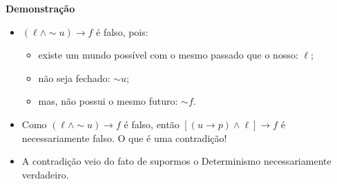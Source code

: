 \begin{frame}{\textbf{Demonstração}}
	
	\begin{itemize}
		\item<17->[$\bullet$] $(\ell \wedge \sim\! u ) \rightarrow f$ é falso, pois:
		 \begin{itemize}
				\item<18-|alert@18> existe um mundo possível com o mesmo passado que o nosso: $\ell$;
				\item<19-|alert@19> não seja fechado: $\sim\! u$;
				\item<20-|alert@20> mas, não possui o mesmo futuro: $\sim\! f$.
			\end{itemize}
		\item<21->[$\bullet$] Como $(\ell \wedge \sim\! u) \rightarrow f$ é falso, então
			$[(u\rightarrow p) \wedge \ell]\rightarrow f$ é necessariamente falso.
			O que é uma contradição!
		\item<22-> A contradição veio do fato de supormos o Determinismo necessariamente
		verdadeiro.
	\end{itemize}
\end{frame}

